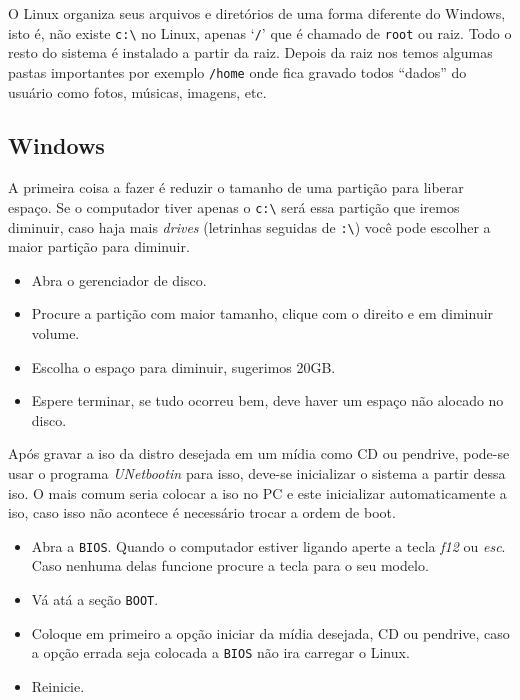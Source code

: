\documentclass{handout_utfpr}
\begin{document}
O Linux organiza seus arquivos e diretórios de uma forma diferente do Windows, isto é, não existe \texttt{c:\textbackslash} no Linux, apenas `\texttt{/}' que é chamado de \texttt{root} ou raiz. Todo o resto do sistema é instalado a partir da raiz. Depois da raiz nos temos algumas pastas importantes por exemplo \texttt{/home} onde fica gravado todos ``dados'' do usuário como fotos, músicas, imagens, etc.

\subsection{Windows}
A primeira coisa a fazer é reduzir o tamanho de uma partição para liberar espaço. Se o computador tiver apenas o \texttt{c:\textbackslash} será essa partição que iremos diminuir, caso haja mais \emph{drives} (letrinhas seguidas de \texttt{:\textbackslash}) você pode escolher a maior partição para diminuir.

\begin{itemize}
    \item Abra o gerenciador de disco.
    \item Procure a partição com maior tamanho, clique com o direito e em diminuir volume.
    \item Escolha o espaço para diminuir, sugerimos 20GB.
    \item Espere terminar, se tudo ocorreu bem, deve haver um espaço não alocado no disco.
\end{itemize}

Após gravar a iso da distro desejada em um mídia como CD ou pendrive, pode-se usar o programa \emph{UNetbootin} para isso, deve-se inicializar o sistema a partir dessa iso. O mais comum seria colocar a iso no PC e este inicializar automaticamente a iso, caso isso não acontece é necessário trocar a ordem de boot.

\begin{itemize}\label{itm:boot-order}
    \item Abra a \texttt{BIOS}\@. Quando o computador estiver ligando aperte a tecla \emph{f12} ou \emph{esc}. Caso nenhuma delas funcione procure a tecla para o seu modelo.
    \item Vá atá a seção \texttt{BOOT}.
    \item Coloque em primeiro a opção iniciar da mídia desejada, CD ou pendrive, caso a opção errada seja colocada a \texttt{BIOS} não ira carregar o Linux.
    \item Reinicie.
\end{itemize}
\end{document}
